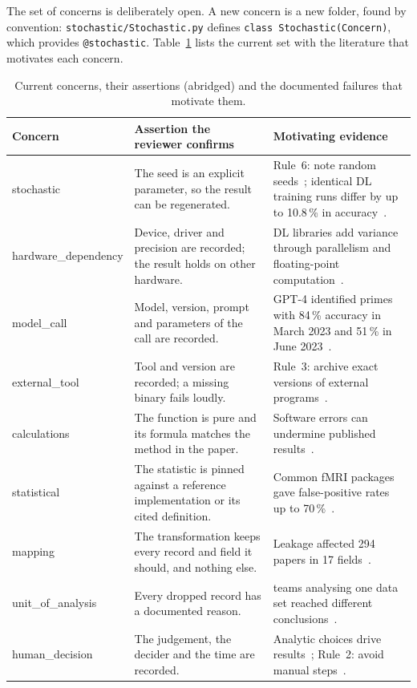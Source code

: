 \documentclass[conference,10pt]{IEEEtran}
\newcommand{\cc}[1]{\texttt{#1}}
\begin{document}
The set of concerns is deliberately open. A new concern is a new folder, found by convention: \cc{stochastic/Stochastic.py} defines \cc{class Stochastic(Concern)}, which provides \cc{@stochastic}. Table~\ref{tab:concerns} lists the current set with the literature that motivates each concern.

\begin{table}[t]
\caption{Current concerns, their assertions (abridged) and the documented failures that motivate them.}
\label{tab:concerns}
\centering
\footnotesize
\begin{tabularx}{\textwidth}{@{}>{\ttfamily}l >{\raggedright\arraybackslash}X >{\raggedright\arraybackslash}X@{}}
\toprule
\normalfont\textbf{Concern} & \textbf{Assertion the reviewer confirms} & \textbf{Motivating evidence} \\
\midrule
stochastic & The seed is an explicit parameter, so the result can be regenerated. & Rule~6: note random seeds~\cite{sandve2013}; identical DL training runs differ by up to 10.8\,\% in accuracy~\cite{pham2020}. \\
hardware\_dependency & Device, driver and precision are recorded; the result holds on other hardware. & DL libraries add variance through parallelism and floating-point computation~\cite{pham2020}. \\
model\_call & Model, version, prompt and parameters of the call are recorded. & GPT-4 identified primes with 84\,\% accuracy in March 2023 and 51\,\% in June 2023~\cite{chen2024}. \\
external\_tool & Tool and version are recorded; a missing binary fails loudly. & Rule~3: archive exact versions of external programs~\cite{sandve2013}. \\
calculations & The function is pure and its formula matches the method in the paper. & Software errors can undermine published results~\cite{soergel2015}. \\
statistical & The statistic is pinned against a reference implementation or its cited definition. & Common fMRI packages gave false-positive rates up to 70\,\%~\cite{eklund2016}. \\
mapping & The transformation keeps every record and field it should, and nothing else. & Leakage affected 294 papers in 17 fields~\cite{kapoor2023}. \\
unit\_of\_analysis & Every dropped record has a documented reason. & 29 teams analysing one data set reached different conclusions~\cite{silberzahn2018}. \\
human\_decision & The judgement, the decider and the time are recorded. & Analytic choices drive results~\cite{silberzahn2018}; Rule~2: avoid manual steps~\cite{sandve2013}. \\

\end{tabularx}
\end{table}
\end{document}
